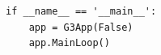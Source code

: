 \documentclass[12pt]{article}
\begin{document}
 {\footnotesize
   \linenumbers*
 \begin{verbatim}
if __name__ == '__main__':
    app = G3App(False)
    app.MainLoop()
 \end{verbatim}
 }

%
%







\end{document}
